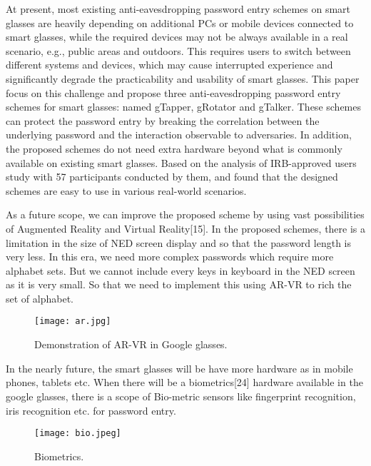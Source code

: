 \documentclass[12pt,a4paper,oneside]{report}
\begin{document}
At present, most existing anti-eavesdropping password entry
schemes on smart glasses are heavily depending on additional
PCs or mobile devices connected to smart glasses, while the
required devices may not be always available in a real scenario,
e.g., public areas and outdoors. This requires users to switch
between different systems and devices, which may cause interrupted experience and significantly degrade the practicability
and usability of smart glasses. This paper focus on
this challenge and propose three anti-eavesdropping password
entry schemes for smart glasses: named gTapper, gRotator
and gTalker. These schemes can protect the password entry
by breaking the correlation between the underlying password
and the interaction observable to adversaries. In addition, the proposed
schemes do not need extra hardware beyond what is commonly
available on existing smart glasses. Based on the analysis of  IRB-approved users study with
57 participants conducted by them, and found that the designed schemes are easy
to use in various real-world scenarios. \newline 
\par As a future scope, we can improve the proposed scheme by using vast possibilities of Augmented Reality and Virtual Reality[15].
In the proposed schemes, there is a limitation in the size of NED screen display and so that the password length is very less. In this era, we need more complex passwords which require more alphabet sets. But we cannot include every keys in keyboard in the NED screen as it is very small. So that we need to implement this using AR-VR to rich the set of alphabet.
\begin{figure}[H]
    \begin{center}
        \label{abc}
            \texttt{[image: ar.jpg]}
            \caption{Demonstration of AR-VR in Google glasses.}
    \end{center}
\end{figure}
\par In the nearly future, the smart glasses will be have more hardware as in mobile phones, tablets etc.
When there will be a biometrics[24] hardware available in the google glasses, there is a scope of Bio-metric sensors like fingerprint recognition, iris
recognition etc. for password entry.

\begin{figure}[H]
    \begin{center}
        \label{abc}
            \texttt{[image: bio.jpeg]}
            \caption{Biometrics.}
    \end{center}
\end{figure}
\end{document}
